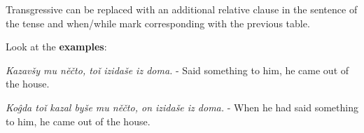 Transgressive can be replaced with an additional relative clause in the sentence of the tense and when/while mark corresponding with the previous table.


Look at the \textbf{examples}:

\textit{Kazavšy mu něčto, toǐ izidaše iz doma.} - Said something to him, he came out of the house.

\textit{Koĝda toǐ kazal byše mu něčto, on izidaše iz doma.} - When he had said something to him, he came out of the house.

